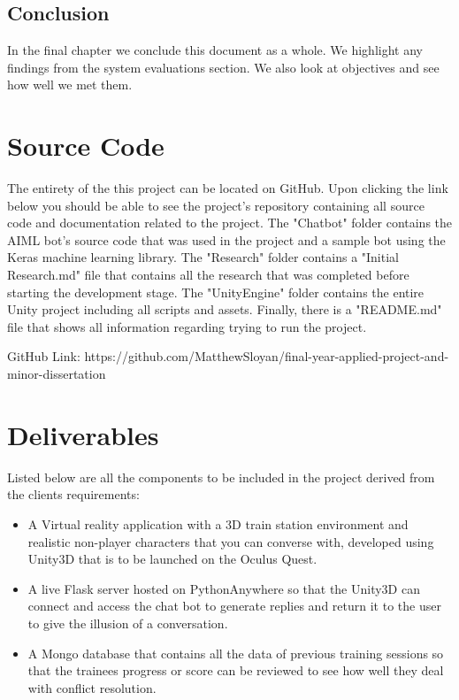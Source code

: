 \subsection{Conclusion}
In the final chapter we conclude this document as a whole. We highlight any findings from the system evaluations section. We also look at objectives and see how well we met them.

\section{Source Code}
The entirety of the this project can be located on GitHub. Upon clicking the link below you should be able to see the project's repository containing all source code and documentation related to the project. The "Chatbot" folder contains the AIML bot's source code that was used in the project and a sample bot using the Keras machine learning library. The "Research" folder contains a "Initial Research.md" file that contains all the research that was completed before starting the development stage. The "UnityEngine" folder contains the entire Unity project including all scripts and assets. Finally, there is a "README.md" file that shows all information regarding trying to run the project.
\newline

GitHub Link: https://github.com/MatthewSloyan/final-year-applied-project-and-minor-dissertation

\section{Deliverables}
Listed below are all the components to be included in the project derived from the clients requirements:

\begin{itemize}
    \item A Virtual reality application with a 3D train station environment and realistic non-player characters that you can converse with, developed using Unity3D that is to be launched on the Oculus Quest.
    
    \item A live Flask server hosted on PythonAnywhere so that the Unity3D can connect and access the chat bot to generate replies and return it to the user to give the illusion of a conversation.
    
    \item A Mongo database that contains all the data of previous training sessions so that the trainees progress or score can be reviewed to see how well they deal with conflict resolution. 
\end{itemize}
\newpage

